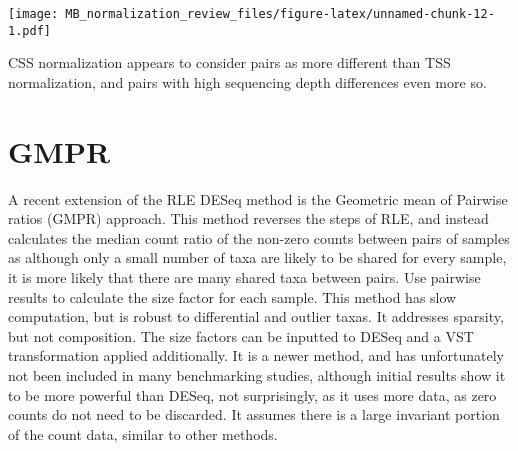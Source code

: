 \documentclass[
]{book}
\begin{document}
\texttt{[image: MB\_normalization\_review\_files/figure-latex/unnamed-chunk-12-1.pdf]}

CSS normalization appears to consider pairs as more different than TSS normalization, and pairs with high sequencing depth differences even more so.

\hypertarget{gmpr}{%
\chapter{GMPR}\label{gmpr}}

A recent extension of the RLE DESeq method is the Geometric mean of Pairwise ratios (GMPR) approach. This method reverses the steps of RLE, and instead calculates the median count ratio of the non-zero counts between pairs of samples as although only a small number of taxa are likely to be shared for every sample, it is more likely that there are many shared taxa between pairs. Use pairwise results to calculate the size factor for each sample. This method has slow computation, but is robust to differential and outlier taxas. It addresses sparsity, but not composition.
The size factors can be inputted to DESeq and a VST transformation applied additionally. It is a newer method, and has unfortunately not been included in many benchmarking studies, although initial results show it to be more powerful than DESeq, not surprisingly, as it uses more data, as zero counts do not need to be discarded. It assumes there is a large invariant portion of the count data, similar to other methods.
\end{document}
